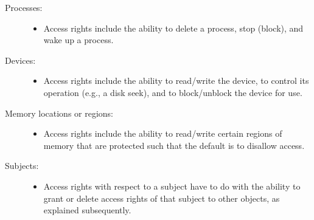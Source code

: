 \documentclass{article}
\begin{document}
                            \begin{description}
                                \item[Processes:]
                                \begin{itemize}
                                    \item Access rights include the ability to delete a process, stop (block), and wake up a process.
                                \end{itemize}
                                \item[Devices:]
                                \begin{itemize}
                                    \item Access rights include the ability to read/write the device, to control its operation (e.g., a disk seek), and to block/unblock the device for use.
                                \end{itemize}
                                \item[Memory locations or regions:]
                                \begin{itemize}
                                    \item Access rights include the ability to read/write certain regions of memory that are protected such that the default is to disallow access.
                                \end{itemize}
                                \item[Subjects:]
                                \begin{itemize}
                                    \item Access rights with respect to a subject have to do with the ability to grant or delete access rights of that subject to other objects, as explained subsequently.
                                \end{itemize}
                            \end{description}
                            
\end{document}
